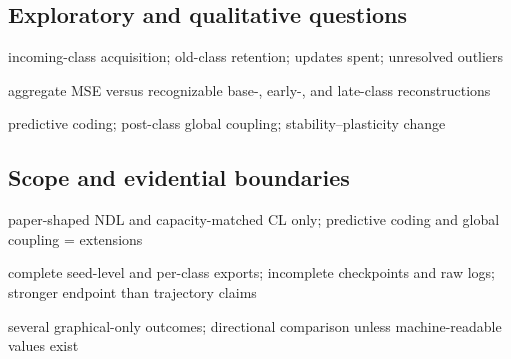 \subsection{Exploratory and qualitative questions}
\begin{draftpoints}
  \item {}incoming-class acquisition; old-class retention; updates spent; unresolved outliers
  \item {}aggregate MSE versus recognizable base-, early-, and late-class reconstructions
  \item {}predictive coding; post-class global coupling; stability--plasticity change
\end{draftpoints}

\subsection{Scope and evidential boundaries}
\begin{draftpoints}
  \item {}paper-shaped NDL and capacity-matched CL only; predictive coding and global coupling = extensions
  \item {}complete seed-level and per-class exports; incomplete checkpoints and raw logs; stronger endpoint than trajectory claims
  \item {}several graphical-only outcomes; directional comparison unless machine-readable values exist
\end{draftpoints}
